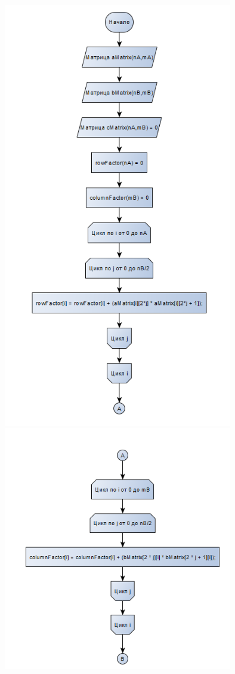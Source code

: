 \documentclass[12pt,a4paper]{scrartcl}
\begin{document}
\begin{center}
	\centering
	\includegraphics[width=10cm]{multimatrixvinograd1}\\
	\includegraphics[width=10cm]{multimatrixvinograd2}\\

\end{center}
\end{document}
